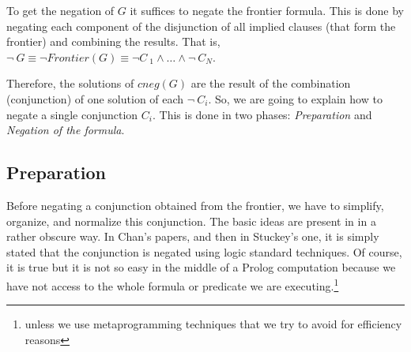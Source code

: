 \documentclass{tlp}
\begin{document}
To get the negation of $G$ it suffices to negate the frontier
formula. This is done by negating each component of the disjunction of
all implied clauses (that form the frontier) and combining the
results. That is, $\neg ~ G \equiv \neg Frontier(G) \equiv \neg C~ _1
\wedge \ldots \wedge \neg~  C_N$.

Therefore, the solutions of $cneg(G)$ are the result of the
combination (conjunction) of one solution of each $\neg ~ C_i$. So, we
are going to explain how to negate a single conjunction $C_i$. This is
done in two phases: \emph{Preparation} and \emph{Negation of the
formula}.




\subsection{Preparation}
\label{preparation}


Before negating a conjunction obtained from the frontier, we have to
simplify, organize, and normalize this conjunction. The basic ideas are
present in \cite{Chan1} in a rather obscure way. In Chan's papers,
and then in Stuckey's one, it is simply stated that the conjunction is negated
using logic standard techniques. Of course, it is true but it is not so
easy in the middle of a Prolog computation because we have not
access to the whole formula or predicate we are executing.\footnote{unless 
we use metaprogramming techniques that we try to avoid for efficiency reasons}
\end{document}
